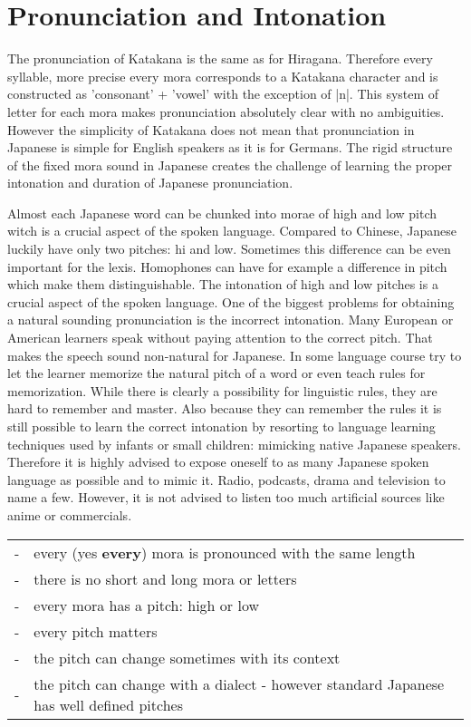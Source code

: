 \section{Pronunciation and Intonation}\label{sec:PronunciationAndIntonation}

The pronunciation of Katakana is the same as for Hiragana. Therefore every
syllable, more precise every mora corresponds to a Katakana character and is
constructed as 'consonant' + 'vowel' with the exception of |n|. This system of
letter for each mora makes pronunciation absolutely clear with no ambiguities.
However the simplicity of Katakana does not mean that pronunciation in Japanese
is simple for English speakers as it is for Germans.  The rigid structure of
the fixed mora sound in Japanese creates the challenge of learning the proper
intonation and duration of Japanese pronunciation.

Almost each Japanese word can be chunked into morae of high and low pitch witch
is a crucial aspect of the spoken language. Compared to Chinese, Japanese
luckily have only two pitches: hi and low. Sometimes this difference can be
even important for the lexis. Homophones can have for example a difference in
pitch which make them distinguishable.  The intonation of high and low pitches
is a crucial aspect of the spoken language. One of the biggest problems for
obtaining a natural sounding pronunciation is the incorrect intonation. Many
European or American learners speak without paying attention to the correct
pitch. That makes the speech sound non-natural for Japanese. In some language
course try to let the learner memorize the natural pitch of a word or even
teach rules for memorization. While there is clearly a possibility for
linguistic rules, they are hard to remember and master. Also because they can
remember the rules it is still possible to learn the correct intonation by
resorting to language learning techniques used by infants or small children:
mimicking native Japanese speakers. Therefore it is highly advised to expose
oneself to as many Japanese spoken language as possible and to mimic it. Radio,
podcasts, drama and television to name a few. However, it is not advised to
listen too much artificial sources like anime or commercials.

\bigskip
\begin{tabular}{rl}
-&every (yes \textbf{every}) mora is pronounced with the same length\\
-&there is no short and long mora or letters\\
-&every mora has a pitch: high or low\\
-&every pitch matters\\
-&the pitch can change  sometimes with its context\\
-&the pitch can change with a dialect - however standard Japanese has well defined pitches\\
\end{tabular}

